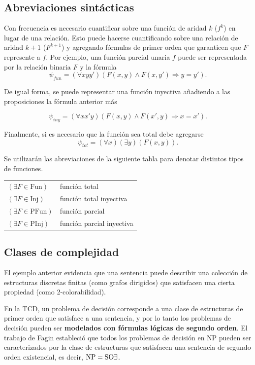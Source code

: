 \subsection{Abreviaciones sintácticas}
Con frecuencia es necesario cuantificar sobre una función de aridad $k$ ($f^k$)
en lugar de una relación. Esto puede hacerse cuantificando sobre una relación de
aridad $k+1$ ($F^{k+1}$) y agregando fórmulas de primer orden que garanticen
que $F$ represente a $f$. Por ejemplo, una función parcial unaria $f$ puede ser
representada por la relación binaria $F$ y la fórmula
\[ \psi_{fun} = (\forall xyy')(F(x, y) \land F(x, y') \Rightarrow y = y'). \]

De igual forma, se puede representar una función inyectiva añadiendo a las
proposiciones la fórmula anterior más

\[ \psi_{iny} = (\forall xx'y)(F(x, y) \land F(x', y) \Rightarrow x = x'). \]

Finalmente, si es necesario que la función sea total debe agregarse
\[ \psi_{tot} = (\forall x)(\exists y)(F(x, y)). \]

Se utilizarán las abreviaciones de la siguiente tabla para denotar distintos
tipos de funciones.

\begin{tabular}{ll}
$(\exists F \in \text{Fun})$ & función total\\
$(\exists F \in \text{Inj})$ & función total inyectiva\\
$(\exists F \in \text{PFun})$ & función parcial\\
$(\exists F \in \text{PInj})$ & función parcial inyectiva\\
\end{tabular}

\subsection{Clases de complejidad}
El ejemplo anterior evidencia que una sentencia puede describir una colección
de estructuras discretas finitas (como grafos dirigidos) que satisfacen
una cierta propiedad (como 2-colorabilidad). 

En la TCD, un problema de decisión corresponde a una clase de estructuras de
primer orden que satisface a una sentencia, y por lo tanto los problemas de
decisión pueden ser \textbf{modelados con fórmulas lógicas de segundo orden}.
El trabajo de Fagin \cite{fagin:spectra} estableció que todos los problemas de
decisión en NP pueden ser caracterizados por la clase de estructuras que
satisfacen una sentencia de segundo orden existencial, es decir,
$\text{NP}=\text{SO}\exists$.

